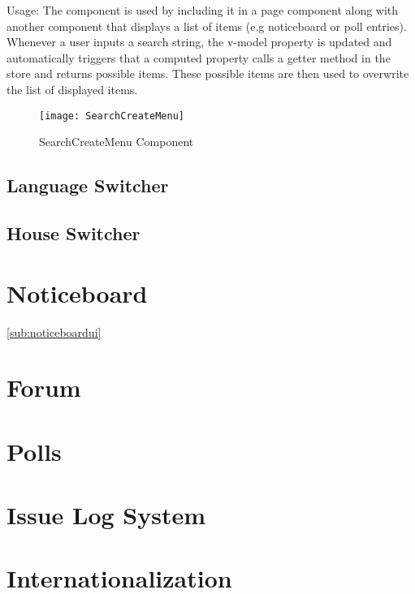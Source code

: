 Usage: The component is used by including it in a page component along with another component that displays a list of items (e.g noticeboard or poll entries). Whenever a user inputs a search string, the v-model property is updated and automatically triggers that a computed property calls a getter method in the store and returns possible items. These possible items are then used to overwrite the list of displayed items.

\begin{figure}[H]
  \begin{center}
  \texttt{[image: SearchCreateMenu]}
  \end{center}
  \caption{SearchCreateMenu Component}
  \label{fig:searchcreate}
\end{figure}



\subsection{Language Switcher}

\subsection{House Switcher}

\section{Noticeboard}

\autoref{sub:noticeboardui}
\section{Forum}

\section{Polls}

\section{Issue Log System}

\section{Internationalization}
